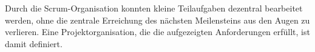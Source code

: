 
Durch die Scrum-Organisation konnten kleine Teilaufgaben dezentral bearbeitet werden, ohne die zentrale Erreichung des
nächsten Meilensteins aus den Augen zu verlieren. Eine Projektorganisation, die die aufgezeigten Anforderungen
erfüllt, ist damit definiert.






